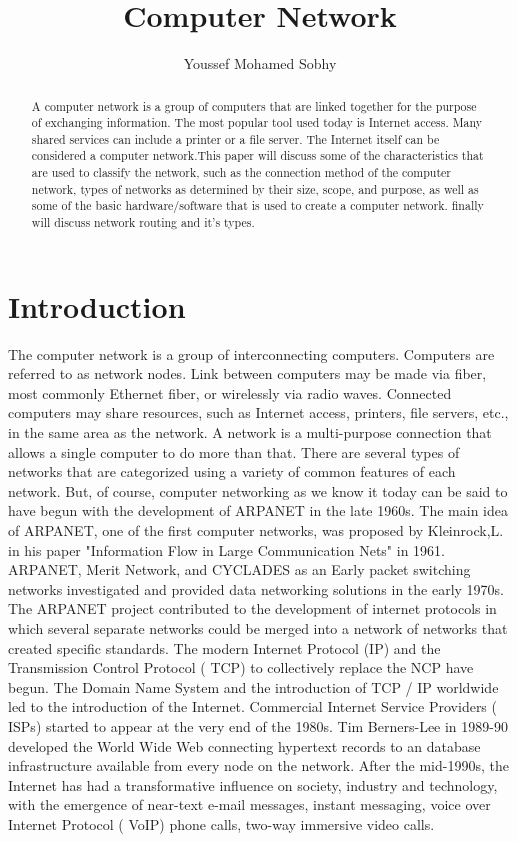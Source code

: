 \documentclass[12pt]{article}
\begin{document}
\author{Youssef Mohamed Sobhy}
\title{\textbf{Computer Network}}
\maketitle
\tableofcontents

\begin{abstract}
A computer network is a group of computers that are linked together for the purpose of exchanging information. The most popular tool used today is Internet access. Many shared services can include a printer or a file server. The Internet itself can be considered a computer network.This paper will discuss some of the characteristics that are used to classify the network, such as the connection method of the computer network, types of networks as determined by their size, scope, and purpose, as well as some of the basic hardware/software that is used to create a computer network. finally will discuss network routing and it's types.

\end{abstract}
\section{Introduction}
\label{S:1}
The computer network is a group of interconnecting computers. Computers are referred to as network nodes. Link between computers may be made via fiber, most commonly Ethernet fiber, or wirelessly via radio waves. Connected computers may share resources, such as Internet access, printers, file servers, etc., in the same area as the network. A network is a multi-purpose connection that allows a single computer to do more than that. There are several types of networks that are categorized using a variety of common features of each network. But, of course, computer networking as we know it today can be said to have begun with the development of ARPANET in the late 1960s. The main idea of ARPANET, one of the first computer networks, was proposed by Kleinrock,L. in his paper "Information Flow in Large Communication Nets" in 1961. ARPANET, Merit Network, and CYCLADES as an Early packet switching networks investigated and provided data networking solutions in the early 1970s. The ARPANET project contributed to the development of internet protocols in which several separate networks could be merged into a network of networks that created specific standards. The modern Internet Protocol (IP) and the Transmission Control Protocol ( TCP) to collectively replace the NCP have begun.\cite{1}
The Domain Name System and the introduction of TCP / IP worldwide led to the introduction of the Internet. Commercial Internet Service Providers ( ISPs) started to appear at the very end of the 1980s. Tim Berners-Lee in 1989-90 developed the World Wide Web connecting hypertext records to an database infrastructure available from every node on the network. After the mid-1990s, the Internet has had a transformative influence on society, industry and technology, with the emergence of near-text e-mail messages, instant messaging, voice over Internet Protocol ( VoIP) phone calls, two-way immersive video calls.\cite{2}
\end{document}
